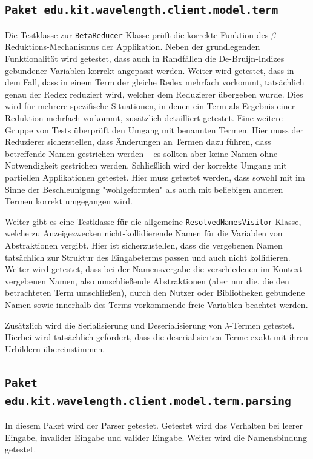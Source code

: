 \documentclass[parskip=full,11pt]{scrartcl}
\begin{document}
\subsection{\texttt{Paket edu.kit.wavelength.client.model.term}}
Die Testklasse zur \texttt{BetaReducer}-Klasse prüft die korrekte Funktion des $\beta$-Re\-duk\-tions-Me\-cha\-nis\-mus
der Applikation. Neben der grundlegenden Funktionalität wird getestet, dass auch in Randfällen die
De-Bruijn-Indizes gebundener Variablen korrekt angepasst werden. Weiter wird getestet, dass in dem
Fall, dass in einem Term der gleiche Redex mehrfach vorkommt, tatsächlich genau der Redex reduziert
wird, welcher dem Reduzierer übergeben wurde. Dies wird für mehrere spezifische Situationen, in denen
ein Term als Ergebnis einer Reduktion mehrfach vorkommt, zusätzlich detailliert getestet. Eine weitere
Gruppe von Tests überprüft den Umgang mit benannten Termen. Hier muss der Reduzierer sicherstellen, dass
Änderungen an Termen dazu führen, dass betreffende Namen gestrichen werden -- es sollten aber keine Namen
ohne Notwendigkeit gestrichen werden. Schließlich wird der korrekte Umgang mit partiellen Applikationen getestet. Hier
muss getestet werden, dass sowohl mit im Sinne der Beschleunigung "wohlgeformten" als auch mit beliebigen
anderen Termen korrekt umgegangen wird.

Weiter gibt es eine Testklasse für die allgemeine \texttt{ResolvedNamesVisitor}-Klasse, welche zu Anzeigezwecken
nicht-kollidierende Namen für die Variablen von Abstraktionen vergibt. Hier ist sicherzustellen, dass die
vergebenen Namen tatsächlich zur Struktur des Eingabeterms passen und auch nicht kollidieren. Weiter wird
getestet, dass bei der Namensvergabe die verschiedenen im Kontext vergebenen Namen, also umschließende Abstraktionen
(aber nur die, die den betrachteten Term umschließen), durch den Nutzer oder Bibliotheken gebundene Namen sowie
innerhalb des Terms vorkommende freie Variablen beachtet werden.

Zusätzlich wird die Serialisierung und Deserialisierung von $\lambda$-Termen getestet. Hierbei wird tatsächlich
gefordert, dass die deserialisierten Terme exakt mit ihren Urbildern übereinstimmen.

\subsection{\texttt{Paket edu.kit.wavelength.client.model.term.parsing}}
In diesem Paket wird der Parser getestet.
Getestet wird das Verhalten bei leerer Eingabe, invalider Eingabe und valider Eingabe.
Weiter wird die Namensbindung getestet.
\end{document}
